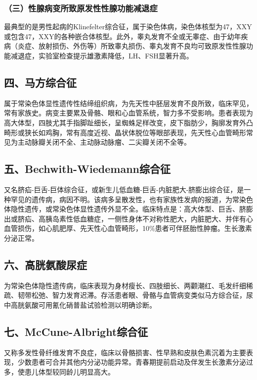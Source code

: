 \subsubsection{（三）性腺病变所致原发性性腺功能减退症}

最典型的是男性起病的Klinefelter综合征，属于染色体病，染色体核型为47，XXY或包含47，XXY的各种嵌合体核型。此外，睾丸发育不全或无睾症、由于幼年疾病（炎症、放射损伤、外伤等）所致睾丸损伤、睾丸发育不良均可致原发性性腺功能减退症，实验室检查提示雄激素降低，LH、FSH显著升高。

\subsection{四、马方综合征}

属于常染色体显性遗传性结缔组织病，为先天性中胚层发育不良所致，临床罕见，常有家族史。病变主要累及骨骼、眼和心血管系统，智力多不受影响。患者表现为高大体型，四肢尤其手指脚趾细长，呈蜘蛛足样改变，皮下脂肪少，胸廓发育外凸畸形或狭长如鸡胸，常有高度近视、晶状体脱位等眼部表现，先天性心血管畸形常见为主动脉瓣关闭不全、主动脉动脉瘤、二尖瓣关闭不全等。

\subsection{五、Bechwith-Wiedemann综合征}

又名脐疝-巨舌-巨体综合征，或新生儿低血糖-巨舌-内脏肥大-脐膨出综合征，是一种罕见的遗传病，病因不明。该病多呈散发性，也有家族性发病的报道，为常染色体隐性遗传，或常染色体显性遗传外显不全。临床特点是：高大体型、巨舌、脐膨出或脐疝、高胰岛素性低血糖症，一侧性身体不对称性肥大，内脏肥大、并伴有心血管损伤，如心肌肥厚、先天性心血管畸形，10\%患者可伴胚胎性肿瘤。生长激素分泌正常。

\subsection{六、高胱氨酸尿症}

为常染色体隐性遗传病，临床表现为身材瘦长、四肢细长、两颧潮红、毛发纤细稀疏、韧带松弛、智力发育迟滞。存活患者眼、骨骼与血管病变类似马方综合征，尿中高胱氨酸可用氰化硝普盐试验检测以明确诊断。

\subsection{七、McCune-Albright综合征}

又称多发性骨纤维发育不良症，临床以骨骼损害、性早熟和皮肤色素沉着为主要表现，少数患者可合并其他内分泌功能异常。青春期提前启动及伴发生长激素分泌过多，使患儿体型较同龄儿明显高大。

